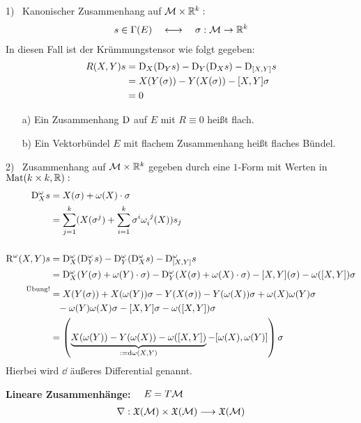 \begin{bsp}
1) \ Kanonischer Zusammenhang auf $\mathcal{M} \times \mathbb{R}^k:$
\begin{align*}
s \in \Gamma(E) \quad \longleftrightarrow \quad \sigma: \mathcal{M} \rightarrow \mathbb{R}^k 
\end{align*}
In diesen Fall ist der Krümmungstensor wie folgt gegeben:
\begin{align*}
R(X,Y)s &= \mathrm{D}_X(\mathrm{D}_Ys) - \mathrm{D}_Y(\mathrm{D}_Xs) - \mathrm{D}_{[X,Y]}s \\
			&= X(Y(\sigma)) - Y(X(\sigma)) - [X,Y]\sigma \\
			&= 0
\end{align*}
\end{bsp}

\begin{defs}
\begin{itemize}
	\item[a)] Ein Zusammenhang $\mathrm{D}$ auf $E$ mit $R \equiv 0$ heißt flach.
	\item[b)] Ein Vektorbündel $E$ mit flachem Zusammenhang heißt flaches Bündel.
\end{itemize}
\end{defs}

\begin{bsp}
2) \ Zusammenhang auf $\mathcal{M} \times \mathbb{R}^k$ gegeben durch eine $1$-Form mit Werten in $\operatorname{Mat}(k \times k,\mathbb{R}):$
\begin{align*}
\mathrm{D}^{\omega}_X s &= X(\sigma) + \omega(X)\cdot\sigma \\
							&= \sum_{j=1}^{k} (X(\sigma^{j}) + \sum_{i=1}^{k} \sigma^{i}\omega_i^{\phantom{i}j}(X))s_j \\
							\phantom{.} \\
\operatorname{R}^{\omega}(X,Y)s &= \mathrm{D}^{\omega}_X(\mathrm{D}^{\omega}_Ys) - \mathrm{D}^{\omega}_Y(\mathrm{D}^{\omega}_Xs) - \mathrm{D}^{\omega}_{[X,Y]}s \\
&= \mathrm{D}^{\omega}_X(Y(\sigma) + \omega(Y)\cdot\sigma) - \mathrm{D}^{\omega}_Y(X(\sigma)+ \omega(X)\cdot\sigma) - [X,Y](\sigma) - \omega([X,Y]) \sigma \\
\overset{\text{Übung!}}{\phantom{=}} &= X(Y(\sigma)) + X(\omega(Y))\sigma - Y(X(\sigma)) - Y(\omega(X))\sigma + \omega(X)\omega(Y)\sigma \\
& \phantom{=} - \omega(Y)\omega(X)\sigma - [X,Y]\sigma - \omega([X,Y])\sigma \\
&= \left( \underbrace{X(\omega(Y)) - Y(\omega(X)) - \omega([X,Y])}_{:= \dd\omega(X,Y)} - [\omega(X),\omega(Y)]\right) \sigma
\end{align*}
Hierbei wird $\dd$ äußeres Differential genannt.
\end{bsp}
\textbf{Lineare Zusammenhänge:} $ \quad E= T\mathcal{M}$ 
\begin{align*}
\nabla: \mathfrak{X}(\mathcal{M}) \times \mathfrak{X}(\mathcal{M}) \longrightarrow \mathfrak{X}(\mathcal{M})
\end{align*}

